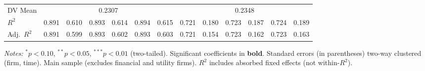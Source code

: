 \documentclass[11pt,a4paper]{article}
\begin{document}
\begin{table}[htbp]
\begin{tabular}{lcccccccccccc}
DV Mean & \multicolumn{6}{c}{0.2307} & \multicolumn{6}{c}{0.2348} \\
$R^2$ & 0.891 & 0.610 & 0.893 & 0.614 & 0.894 & 0.615 & 0.721 & 0.180 & 0.723 & 0.187 & 0.724 & 0.189 \\
Adj.~$R^2$ & 0.891 & 0.599 & 0.893 & 0.602 & 0.893 & 0.603 & 0.721 & 0.154 & 0.723 & 0.162 & 0.723 & 0.163 \\
\bottomrule
\end{tabular}
\begin{minipage}{\linewidth}
\vspace{2pt}\scriptsize
\textit{Notes:} $^{*}p<0.10$, $^{**}p<0.05$, $^{***}p<0.01$ (two-tailed).
 Significant coefficients in \textbf{bold}.
 Standard errors (in parentheses) two-way clustered (firm, time).
 Main sample (excludes financial and utility firms).
 $R^2$ includes absorbed fixed effects (not within-$R^2$).
\end{minipage}
\end{table}
\clearpage
\end{document}
